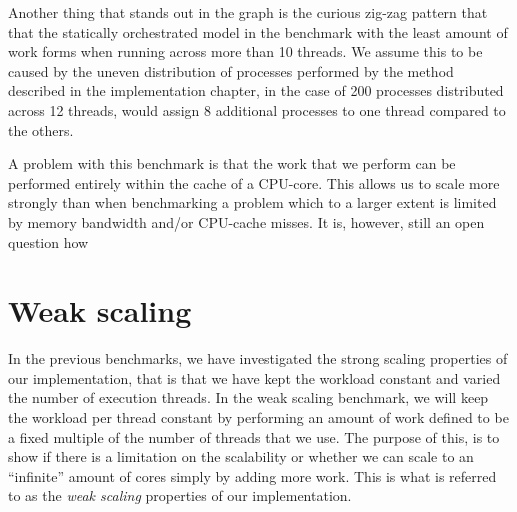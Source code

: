 Another thing that stands out in the graph is the curious zig-zag
pattern that that the statically orchestrated model in the benchmark
with the least amount of work forms when running across more than 10
threads. We assume this to be caused by the uneven distribution of
processes performed by the method described in the implementation
chapter, in the case of 200 processes distributed across 12 threads,
would assign 8 additional processes to one thread compared to the
others.




A problem with this benchmark is that the work that we perform can be
performed entirely within the cache of a CPU-core. This allows us to
scale more strongly than when benchmarking a problem which to a larger
extent is limited by memory bandwidth and/or CPU-cache misses. It is,
however, still an open question how 

\section{Weak scaling}
In the previous benchmarks, we have investigated the strong scaling
properties of our implementation, that is that we have kept the
workload constant and varied the number of execution threads. In the
weak scaling benchmark, we will keep the workload per thread constant
by performing an amount of work defined to be a fixed multiple of the
number of threads that we use. The purpose of this, is to show if
there is a limitation on the scalability or whether we can scale to an
"`infinite"' amount of cores simply by adding more work. This is what
is referred to as the \textit{weak scaling}
properties\cite{weakscaling} of our implementation.

